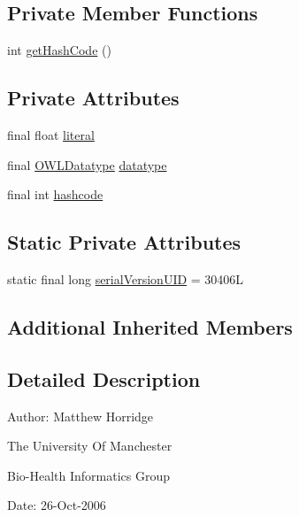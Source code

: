 \subsection*{Private Member Functions}
\begin{DoxyCompactItemize}
\item 
int \hyperlink{classuk_1_1ac_1_1manchester_1_1cs_1_1owl_1_1owlapi_1_1_o_w_l_literal_impl_float_abafa382228c7088d2d9ce1a9dab5d854}{get\-Hash\-Code} ()
\end{DoxyCompactItemize}
\subsection*{Private Attributes}
\begin{DoxyCompactItemize}
\item 
final float \hyperlink{classuk_1_1ac_1_1manchester_1_1cs_1_1owl_1_1owlapi_1_1_o_w_l_literal_impl_float_ac548af9523861b98ff9a22da94e38f7e}{literal}
\item 
final \hyperlink{interfaceorg_1_1semanticweb_1_1owlapi_1_1model_1_1_o_w_l_datatype}{O\-W\-L\-Datatype} \hyperlink{classuk_1_1ac_1_1manchester_1_1cs_1_1owl_1_1owlapi_1_1_o_w_l_literal_impl_float_af7c5c2a2b36b72ee71bef27ef587e65d}{datatype}
\item 
final int \hyperlink{classuk_1_1ac_1_1manchester_1_1cs_1_1owl_1_1owlapi_1_1_o_w_l_literal_impl_float_add784d89582a6ac05a4911f24d8c2b2f}{hashcode}
\end{DoxyCompactItemize}
\subsection*{Static Private Attributes}
\begin{DoxyCompactItemize}
\item 
static final long \hyperlink{classuk_1_1ac_1_1manchester_1_1cs_1_1owl_1_1owlapi_1_1_o_w_l_literal_impl_float_a441fa0fbbd6ba9b3331ce2566f8adc58}{serial\-Version\-U\-I\-D} = 30406\-L
\end{DoxyCompactItemize}
\subsection*{Additional Inherited Members}


\subsection{Detailed Description}
Author\-: Matthew Horridge\par
 The University Of Manchester\par
 Bio-\/\-Health Informatics Group\par
 Date\-: 26-\/\-Oct-\/2006\par
 \par
 

